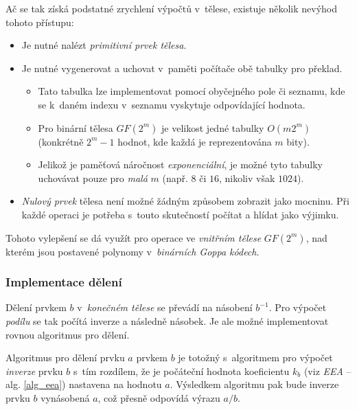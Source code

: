 \documentclass[thesis=M,czech,hidelinks]{FITthesis}[2012/06/26]
\newcommand{\0}{{\textcolor[gray]{0.100}{0}}}
\begin{document}
Ač se tak získá podstatné zrychlení výpočtů v~tělese, existuje několik nevýhod
tohoto přístupu:

\begin{itemize}
    \item Je nutné nalézt \emph{primitivní prvek tělesa}.

    \item Je nutné vygenerovat a uchovat v~paměti počítače obě tabulky pro
        překlad.
        \begin{itemize}
            \item Tato tabulka lze implementovat pomocí obyčejného pole či
                seznamu, kde se k~daném indexu v~seznamu vyskytuje odpovídající
                hodnota.
            \item Pro binární  tělesa $GF(2^m)$ je velikost jedné tabulky
                $O(m 2^m)$ (konkrétně $2^m - 1$ hodnot, kde každá je reprezentována
                $m$ bity).
            \item Jelikož je paměťová náročnost \emph{exponenciální}, je
                možné tyto tabulky uchovávat pouze pro \emph{malá} $m$ (např.
                $8$ či $16$, nikoliv však $1024$).
        \end{itemize}

    \item \emph{Nulový prvek} tělesa není možné žádným způsobem zobrazit jako
        mocninu. Při každé operaci je potřeba s~touto skutečností počítat
        a hlídat jako výjimku.

\end{itemize}


Tohoto vylepšení se dá využít pro operace ve \emph{vnitřním tělese}
$GF(2^m)$, nad kterém jsou postavené polynomy v~\emph{binárních Goppa kódech}.


\subsubsection{Implementace dělení}
Dělení prvkem $b$ v~\emph{konečném tělese} se převádí na násobení $b^{-1}$. Pro
výpočet \emph{podílu} se tak počítá inverze a následně násobek. Je ale možné
implementovat rovnou algoritmus pro dělení.

Algoritmus pro dělení prvku $a$ prvkem $b$ je totožný s~algoritmem pro výpočet
\emph{inverze} prvku $b$ s~tím rozdílem, že je počáteční hodnota koeficientu
$k_b$ (viz \emph{EEA} -- alg. \ref{alg_eea}) nastavena na hodnotu $a$.
%
Výsledkem algoritmu pak bude inverze prvku $b$ vynásobená $a$, což přesně
odpovídá výrazu $a/b$.
\end{document}
